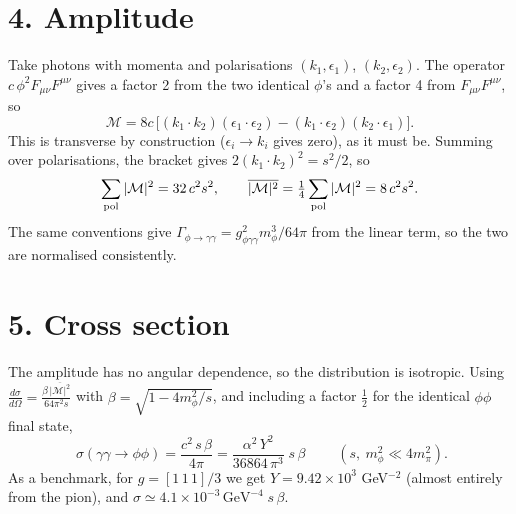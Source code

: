 \documentclass[11pt]{article}
\newcommand{\Fsq}{F_{\mu\nu}F^{\mu\nu}}
\begin{document}
\section*{4. Amplitude}
Take photons with momenta and polarisations $(k_1,\epsilon_1)$,
$(k_2,\epsilon_2)$. The operator $c\,\phi^2\Fsq$ gives a factor 2 from the two
identical $\phi$'s and a factor 4 from $\Fsq$, so
\begin{equation}
  \mathcal M = 8c\,\big[(k_1\!\cdot k_2)(\epsilon_1\!\cdot\epsilon_2)
             - (k_1\!\cdot\epsilon_2)(k_2\!\cdot\epsilon_1)\big].
\end{equation}
This is transverse by construction ($\epsilon_i\to k_i$ gives zero), as it must
be. Summing over polarisations, the bracket gives
$2(k_1\!\cdot k_2)^2 = s^2/2$, so
\begin{equation}
  \sum_{\rm pol}|\mathcal M|^2 = 32\,c^2 s^2,\qquad
  \overline{|\mathcal M|^2} = \tfrac14\sum_{\rm pol}|\mathcal M|^2 = 8\,c^2 s^2 .
\end{equation}
The same conventions give $\Gamma_{\phi\to\gamma\gamma}=g_{\phi\gamma\gamma}^2m_\phi^3/64\pi$
from the linear term, so the two are normalised consistently.

\section*{5. Cross section}
The amplitude has no angular dependence, so the distribution is isotropic.
Using $\frac{d\sigma}{d\Omega} = \frac{\beta\,\overline{|\mathcal M|^2}}{64\pi^2 s}$
with $\beta=\sqrt{1-4m_\phi^2/s}$, and including a factor $\tfrac12$ for the
identical $\phi\phi$ final state,
\begin{equation}
  \boxed{\;\sigma(\gamma\gamma\to\phi\phi) = \frac{c^2\,s\,\beta}{4\pi}
  = \frac{\alpha^2\,Y^2}{36864\,\pi^3}\;s\,\beta\;}
  \qquad (s,\ m_\phi^2 \ll 4m_\pi^2).
\end{equation}
As a benchmark, for $g=[1\,1\,1]/3$ we get $Y = 9.42\times10^3$ GeV$^{-2}$
(almost entirely from the pion), and
$\sigma \simeq 4.1\times10^{-3}\,\text{GeV}^{-4}\; s\,\beta$.
\end{document}
